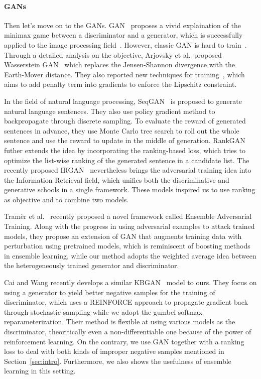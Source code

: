 \documentclass[twocolumn,a4paper,10pt,preprint,3p]{elsarticle}
\begin{document}
\paragraph{GANs} Then let's move on to the GANs. GAN~\cite{GAN} proposes a vivid explaination of the minimax game between a discriminator and a generator, which is successfully applied to the image processing field~\cite{Ledig_2017_CVPR}. However, classic GAN is hard to train~\cite{Salimans_2016}. Through a detailed analysis on the objective, Arjovsky et al.\ proposed Wasserstein GAN~\cite{Arjovsky2017WGAN} which replaces the Jensen-Shannon divergence with the Earth-Mover distance. They also reported new techniques for training~\cite{Gulrajani2017LipschitzReg}, which aims to add penalty term into gradients to enforce the Lipschitz constraint.

In the field of natural language processing, SeqGAN~\cite{SeqGAN} is proposed to generate natural language sentences. They also use policy gradient method to backpropagate through discrete sampling. To evaluate the reward of generated sentences in advance, they use Monte Carlo tree search to roll out the whole sentence and use the reward to update in the middle of generation. RankGAN~\cite{RankGAN} futher extends the idea by incorporating the ranking-based loss, which tries to optimize the list-wise ranking of the generated sentence in a candidate list. The recently proposed IRGAN~\cite{IRGAN} nevertheless brings the adversarial training idea into the Information Retrieval field, which unifies both the discriminative and generative schools in a single framework. These models inspired us to use ranking as objective and to combine two models.

Tram\`er et al.~\cite{EnsembleAdvTraining} recently proposed a novel framework called Ensemble Adversarial Training. Along with the progress in using adversarial examples to attack trained models, they propose an extension of GAN that augments training data with perturbation using pretrained models, which is reminiscent of boosting methods in ensemble learning, while our method adopts the weighted average idea between the heterogeneously trained generator and discriminator.

Cai and Wang recently develops a similar KBGAN~\cite{Cai2017KBGAN} model to ours. They focus on using a generator to yield better negative samples for the training of discriminator, which uses a REINFORCE approach to propagate gradient back through stochastic sampling while we adopt the gumbel softmax reparameterization. Their method is flexible at using various models as the discriminator, theoritically even a non-differentiable one because of the power of reinforcement learning. On the contrary, we use GAN together with a ranking loss to deal with both kinds of improper negative samples mentioned in Section~\ref{sec:intro}. Furthermore, we also shows the usefulness of ensemble learning in this setting.
\end{document}
